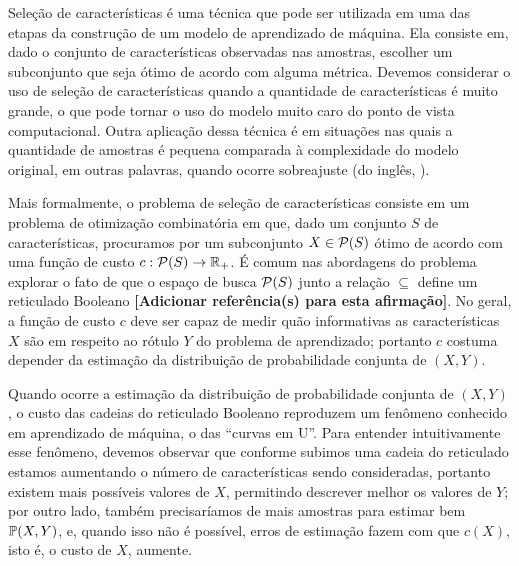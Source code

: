 
Seleção de características é uma técnica que pode ser utilizada em uma das
etapas da construção de um modelo de aprendizado de máquina. Ela consiste
em, dado o conjunto de características observadas nas amostras, escolher
um subconjunto que seja ótimo de acordo com alguma métrica. Devemos 
considerar o uso de seleção de características quando a quantidade de
características é muito grande, o que pode tornar o uso do modelo muito caro
do ponto de vista computacional. Outra aplicação dessa técnica é em situações
nas quais a quantidade de amostras é pequena comparada à complexidade do 
modelo original, em outras palavras, quando ocorre sobreajuste (do 
inglês, ).

Mais formalmente, o problema de seleção de características consiste em
um problema de otimização combinatória em que, dado um conjunto $S$ de 
características, procuramos por um subconjunto $X \in \mathcal{P} (S)$
ótimo de acordo com uma função de custo $c : \mathcal{P}(S) \to 
\mathbb{R}_{+}$. {\color{blue}É comum nas abordagens do problema explorar o fato de que
o espaço de busca $\mathcal{P}(S)$ junto a relação $\subseteq$ define um
reticulado Booleano {\bf[Adicionar referência(s) para esta afirmação]}}. No geral, a função de custo $c$ deve ser capaz de
medir quão informativas as características $X$ são em respeito ao rótulo
$Y$ do problema de aprendizado; portanto $c$ costuma depender da
estimação da distribuição de probabilidade conjunta de $(X, Y)$.

Quando ocorre a estimação da distribuição de probabilidade conjunta de 
$(X, Y)$, o custo das cadeias do reticulado Booleano reproduzem um
fenômeno conhecido em aprendizado de máquina, o das ``curvas em U''. Para 
entender intuitivamente esse fenômeno, devemos observar que conforme 
subimos uma cadeia do reticulado estamos aumentando o número de 
características sendo consideradas, portanto existem mais possíveis
valores de $X$, permitindo descrever melhor os valores de $Y$; por outro
lado, também precisaríamos de mais amostras para estimar bem 
$\mathbb{P} (X, Y)$, e, quando isso não é possível, erros de estimação
fazem com que $c(X)$, isto é, o custo de $X$, aumente.

